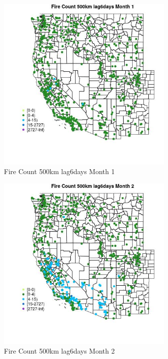 \begin{figure} 
\centering  
\includegraphics[width=0.77\textwidth]{Code_Outputs/Report_ML_input_PM25_Step4_part_f_de_duplicated_aves_prioritize_24hr_obswNAs_MapObsMo1Fire_Count_500km_lag6days.jpg} 
\caption{\label{fig:Report_ML_input_PM25_Step4_part_f_de_duplicated_aves_prioritize_24hr_obswNAsMapObsMo1Fire_Count_500km_lag6days}Fire Count 500km lag6days Month 1} 
\end{figure} 
 

\begin{figure} 
\centering  
\includegraphics[width=0.77\textwidth]{Code_Outputs/Report_ML_input_PM25_Step4_part_f_de_duplicated_aves_prioritize_24hr_obswNAs_MapObsMo2Fire_Count_500km_lag6days.jpg} 
\caption{\label{fig:Report_ML_input_PM25_Step4_part_f_de_duplicated_aves_prioritize_24hr_obswNAsMapObsMo2Fire_Count_500km_lag6days}Fire Count 500km lag6days Month 2} 
\end{figure} 
 

